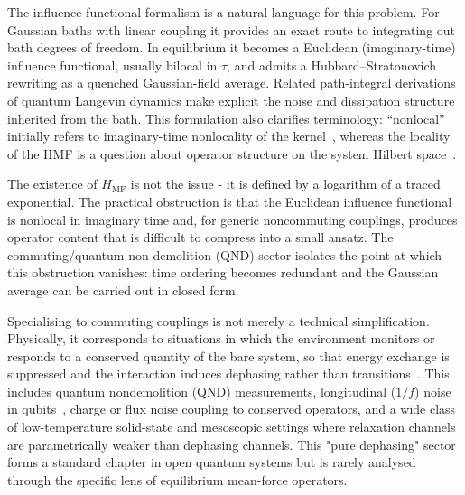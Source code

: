 The influence-functional formalism is a natural language for this problem.
For Gaussian baths with linear coupling it provides an exact route to
integrating out bath degrees of freedom\cite{feynmanTheoryGeneralQuantum1963a,caldeiraQuantumTunnellingDissipative1983a,grabertQuantumBrownianMotion1988}.
In equilibrium it becomes a Euclidean (imaginary-time) influence functional,
usually bilocal in $\tau$, and admits a Hubbard--Stratonovich rewriting as a
quenched Gaussian-field average\cite{hubbardCalculationPartitionFunctions1959a,stratonovich1957QDistro,stockburgerExactNumberRepresentation2002}.
Related path-integral derivations of quantum Langevin dynamics make explicit the
noise and dissipation structure inherited from the bath\cite{kleinertQuantumLangevinEquation1995,vankampenDerivationQuantumLangevin1997}.
This formulation also clarifies terminology: ``nonlocal'' initially refers to
imaginary-time nonlocality of the kernel~\cite{feynmanTheoryGeneralQuantum1963a,grabertQuantumBrownianMotion1988}, whereas the locality of the HMF is a
question about operator structure on the system Hilbert space~\cite{burkeStructureHamiltonianMean2024}.

The existence of $H_{\mathrm{MF}}$ is not the issue - it is defined by
a logarithm of a traced exponential. The practical obstruction is that the
Euclidean influence functional is nonlocal in imaginary time and, for generic
noncommuting couplings, produces operator content that is difficult to compress
into a small ansatz. The commuting/quantum non-demolition (QND) sector isolates the point at which this obstruction vanishes: time ordering becomes redundant and the Gaussian average
can be carried out in closed form. 

Specialising to commuting couplings is not merely a technical simplification.
Physically, it corresponds to situations in which the environment monitors or
responds to a conserved quantity of the bare system, so that energy exchange is
suppressed and the interaction induces dephasing rather than
transitions~\cite{breuerTheoryOpenQuantum2002}. This
includes quantum nondemolition (QND) measurements, longitudinal ($1/f$) noise in qubits~\cite{makhlinQuantumStateEngineering2001,palmaQuantumComputersDissipation1996},
charge or flux noise coupling to conserved operators, and a wide class of
low-temperature solid-state and mesoscopic settings where relaxation channels
are parametrically weaker than dephasing channels. This "pure dephasing"
sector~\cite{clerkIntroductionQuantumNoise2010} forms a standard chapter in open
quantum systems but is rarely analysed through the specific lens of equilibrium
mean-force operators.

